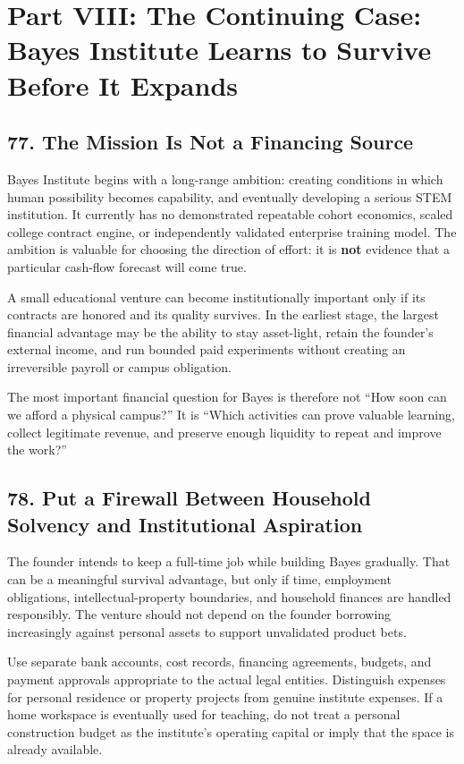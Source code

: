 \section*{Part VIII: The Continuing Case: Bayes Institute Learns to Survive Before It Expands}

\subsection*{77. The Mission Is Not a Financing Source}

Bayes Institute begins with a long-range ambition: creating conditions in which human possibility becomes capability, and eventually developing a serious STEM institution. It currently has no demonstrated repeatable cohort economics, scaled college contract engine, or independently validated enterprise training model. The ambition is valuable for choosing the direction of effort: it is \textbf{not} evidence that a particular cash-flow forecast will come true.

A small educational venture can become institutionally important only if its contracts are honored and its quality survives. In the earliest stage, the largest financial advantage may be the ability to stay asset-light, retain the founder's external income, and run bounded paid experiments without creating an irreversible payroll or campus obligation.

The most important financial question for Bayes is therefore not ``How soon can we afford a physical campus?'' It is ``Which activities can prove valuable learning, collect legitimate revenue, and preserve enough liquidity to repeat and improve the work?''

\subsection*{78. Put a Firewall Between Household Solvency and Institutional Aspiration}

The founder intends to keep a full-time job while building Bayes gradually. That can be a meaningful survival advantage, but only if time, employment obligations, intellectual-property boundaries, and household finances are handled responsibly. The venture should not depend on the founder borrowing increasingly against personal assets to support unvalidated product bets.

Use separate bank accounts, cost records, financing agreements, budgets, and payment approvals appropriate to the actual legal entities. Distinguish expenses for personal residence or property projects from genuine institute expenses. If a home workspace is eventually used for teaching, do not treat a personal construction budget as the institute's operating capital or imply that the space is already available.

